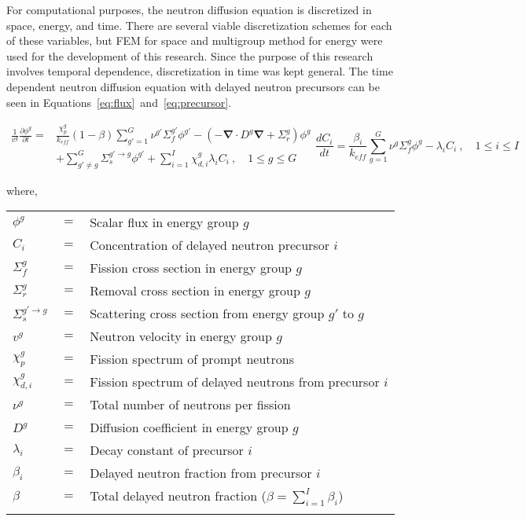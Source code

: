 \documentclass[12pt]{scrartcl}
\renewcommand{\div}{\bs{\nabla}\! \cdot \!}
\newcommand{\grad}{\bs{\nabla}}
\newcommand{\bs}[1]{\mathbf{#1}}
\newcommand{\keff}{k_\textit{eff}}
\newcommand{\be}{\begin{equation}}
\newcommand{\ee}{\end{equation}}
\begin{document}
For computational purposes, the neutron diffusion equation is discretized in space, energy, and time.  There are several viable discretization schemes for each of these variables, but FEM for space and multigroup method for energy were used for the development of this research. Since the purpose of this research involves temporal dependence, discretization in time was kept general.  The time dependent neutron diffusion equation with delayed neutron precursors can be seen in Equations~\ref{eq:flux}~and~\ref{eq:precursor}.

\begin{subequations}
\begin{align}
\frac{1}{v^g}\frac{\partial \phi^g}{\partial t}  =& \frac{\chi_p^g}{\keff} (1-\beta)\sum_{g'=1}^G  \nu^{g'} \Sigma_f^{g'} \phi^{g'} -  \left( -\div D^g \grad  + \Sigma_r^g \right) \phi^g  \nonumber \\
&  + \sum_{g'\neq g}^G\Sigma_s^{g'\to g} \phi^{g'}  + \sum_{i=1}^I\chi_{d,i}^g\lambda_i C_i \ , \quad 1 \le g \le G 
\label{eq:flux}
\end{align}
\be
\frac{dC_i}{dt} = \frac{\beta_i}{\keff}\sum_{g=1}^G\nu^{g} \Sigma_f^g \phi^{g} - \lambda_i C_i \ , \quad 1 \le i \le I 
\label{eq:precursor}
\ee
\end{subequations}

where,

\begin{tabular}{lll}
$\phi^g$   			&	$=$	&	Scalar flux in energy group $g$ \\
$C_i$					  &	$=$	&	Concentration of delayed neutron precursor $i$ \\
$\Sigma_f^{g}$	&	$=$	&	Fission cross section in energy group $g$ \\
$\Sigma_r^{g}$	&	$=$	&	Removal cross section in energy group $g$ \\
$\Sigma_s^{g' \to g}$	&	$=$	&	Scattering cross section from energy group $g'$ to $g$ \\
$v^g$					  &	$=$	&	Neutron velocity in energy group $g$ \\
$\chi_p^g$			&	$=$	&	Fission spectrum of prompt neutrons \\
$\chi_{d,i}^g$	&	$=$	&	Fission spectrum of delayed neutrons from precursor $i$ \\
$\nu^g$					&	$=$	&	Total number of neutrons per fission \\
$D^g$					  &	$=$	&	Diffusion coefficient in energy group $g$\\
$\lambda_i$			&	$=$	&	Decay constant of precursor $i$ \\
$\beta_i$				&	$=$	&	Delayed neutron fraction  from precursor $i$ \\
$\beta$			 	  &	$=$	&	Total delayed neutron fraction ($\beta = \sum_{i=1}^I \beta_{i}$) \\
  & & 
\end{tabular}
\end{document}
